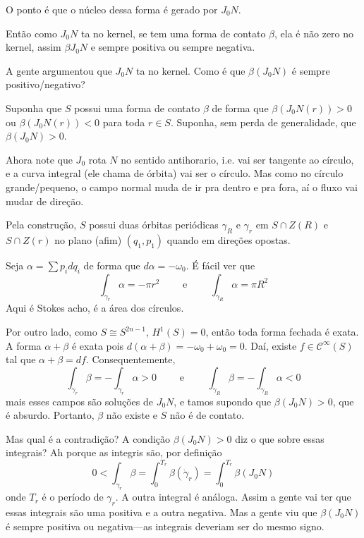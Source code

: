 \begin{example}
 {\color{8} O ponto é que o núcleo dessa forma é gerado por $J_0N$.}

 {\color{8}Então como $J_0N$ ta no kernel, se tem uma forma de contato $\beta$, ela é não zero no kernel, assim $\beta J_0N$ e sempre positiva ou sempre negativa.}

 {\color{8}A gente argumentou que $J_0N$ ta no kernel. Como é que $\beta(J_0N)$ é sempre positivo/negativo? }

 Suponha que $S$ possui uma forma de contato $\beta$ de forma que $\beta(J_0N(r))>0$ ou $ \beta(J_0N(r))<0$ para toda $r \in S$. Suponha, sem perda de generalidade, que $ \beta(J_0N)>0$.

{\color{7}Ahora note que $J_0$ rota $N$ no sentido antihorario, i.e. vai ser tangente  ao círculo, e a curva integral (ele chama de órbita) vai ser o círculo. Mas como no círculo grande/pequeno, o campo normal muda de ir pra dentro e pra fora, aí o fluxo vai mudar de direção.}

Pela construção, $S$ possui duas órbitas periódicas $\gamma_R$ e $\gamma_r$ em $S\cap Z(R)$ e $S\cap Z(r)$ no plano (afim) $(q_1,p_1)$ quando em direções  opostas.

Seja $\alpha=\sum p_idq_i$ de forma que $d\alpha=-\omega_0$. É fácil ver que
\[\int_{\gamma_r}\alpha=-\pi r^2\qquad \text{ e }\qquad \int_{\gamma_R}\alpha=\pi R^2 \]
{\color{8}Aqui é Stokes acho}, é a área dos círculos.

Por outro lado, como $S\cong S^{2n-1}$, $H^{1}(S)=0$, então toda forma fechada é exata. A forma $\alpha+\beta$ é exata pois $d(\alpha+\beta)=-\omega_0+\omega_0=0$. Daí, existe $f \in\mathcal{C}^\infty(S)$ tal que $\alpha+\beta=df$. Consequentemente,
\[\int_{\gamma_r}\beta=-\int_{\gamma_r}\alpha>0 \qquad \text{ e }\qquad \int_{\gamma_R}\beta=-\int_{\gamma_R}\alpha<0 \]
mais esses campos são soluções  de $J_0N$, e tamos supondo que  $\beta(J_0N)>0$, que é absurdo. Portanto, $\beta$ não existe e $S$ não é de contato.

{\color{8}Mas qual é a contradição? A condição $\beta(J_0N)>0$ diz o que sobre essas integrais?}
Ah porque as integris são, por definição 
\[0<\int_{\gamma_r}\beta=\int_{0}^{T_r}\beta(\dot \gamma_r)=\int_{0}^{T_r}\beta(J_0N)\]
onde $T_r$  é o período de $\gamma_r$. A outra integral é análoga. Assim a gente vai ter que essas integrais são uma positiva e a outra negativa. Mas a gente viu que $\beta(J_0N)$ é sempre positiva ou negativa---as integrais deveriam ser do mesmo signo.
\end{example}

